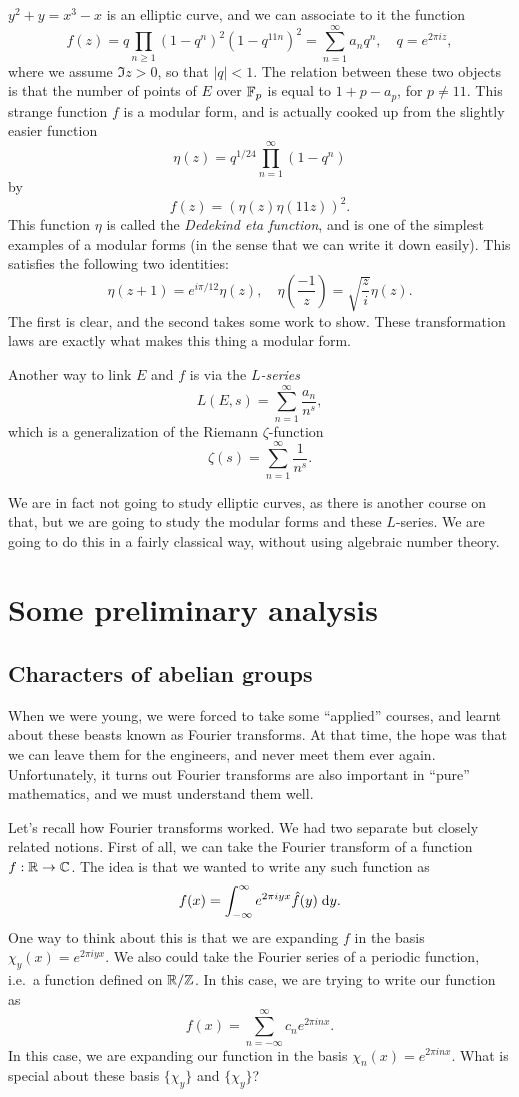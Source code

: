 \documentclass[a4paper]{article}
\begin{document}
\begin{eg}
  $y^2 + y = x^3 - x$ is an elliptic curve, and we can associate to it the function
  \[
    f(z) = q\prod_{n \geq 1} (1 - q^n)^2 (1 - q^{11n})^2 = \sum_{n = 1}^\infty a_n q^n,\quad q= e^{2\pi i z},
  \]
  where we assume $\Im z > 0$, so that $|q| < 1$. The relation between these two objects is that the number of points of $E$ over $\mathbb{F}_p$ is equal to $1 + p - a_p$, for $p \not= 11$. This strange function $f$ is a modular form, and is actually cooked up from the slightly easier function
  \[
    \eta(z) = q^{1/24} \prod_{n = 1}^\infty (1 - q^n)
  \]
  by
  \[
    f(z) = (\eta(z)\eta(11z))^2.
  \]
  This function $\eta$ is called the \emph{Dedekind eta function}, and is one of the simplest examples of a modular forms (in the sense that we can write it down easily). This satisfies the following two identities:
  \[
    \eta(z + 1) = e^{i \pi/12}\eta(z),\quad \eta\left(\frac{-1}{z}\right) = \sqrt{\frac{z}{i}} \eta(z).
  \]
  The first is clear, and the second takes some work to show. These transformation laws are exactly what makes this thing a modular form.

  Another way to link $E$ and $f$ is via the \emph{$L$-series}
  \[
    L(E, s) = \sum_{n = 1}^\infty \frac{a_n}{n^s},
  \]
  which is a generalization of the Riemann $\zeta$-function
  \[
    \zeta(s) = \sum_{n = 1}^\infty \frac{1}{n^s}.
  \]
\end{eg}
We are in fact not going to study elliptic curves, as there is another course on that, but we are going to study the modular forms and these $L$-series. We are going to do this in a fairly classical way, without using algebraic number theory.

\section{Some preliminary analysis}
\subsection{Characters of abelian groups}
When we were young, we were forced to take some ``applied'' courses, and learnt about these beasts known as Fourier transforms. At that time, the hope was that we can leave them for the engineers, and never meet them ever again. Unfortunately, it turns out Fourier transforms are also important in ``pure'' mathematics, and we must understand them well.

Let's recall how Fourier transforms worked. We had two separate but closely related notions. First of all, we can take the Fourier transform of a function $f: \mathbb{R} \to \mathbb{C}$. The idea is that we wanted to write any such function as
\[
  f(x) = \int_{-\infty}^\infty e^{2\pi i yx} \hat{f}(y) \;\mathrm{d} y.
\]
One way to think about this is that we are expanding $f$ in the basis $\chi_y(x) = e^{2\pi i yx}$. We also could take the Fourier series of a periodic function, i.e.\ a function defined on $\mathbb{R}/\mathbb{Z}$. In this case, we are trying to write our function as
\[
  f(x) = \sum_{n = -\infty}^\infty c_n e^{2\pi i n x}.
\]
In this case, we are expanding our function in the basis $\chi_n(x) = e^{2\pi i n x}$. What is special about these basis $\{\chi_y\}$ and $\{\chi_y\}$?
\end{document}
